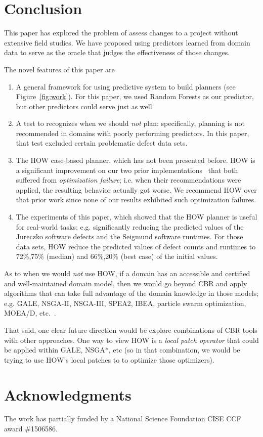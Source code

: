 \documentclass[conference]{IEEEtran}
\newcommand{\be}{\begin{enumerate}}
\newcommand{\ee}{\end{enumerate}}
\newcommand{\fig}[1]{Figure~\ref{fig:#1}}
\begin{document}
%


\section{Conclusion}
 
This paper has explored the problem of assess changes to a project without
extensive field studies. We have proposed using predictors learned from domain data
to serve as the oracle that judges the effectiveness of those changes.

The novel features of this paper are
\be
\item A general framework for using  predictive system to build planners (see \fig{work}).
For this paper, we used Random Forests as our predictor, but other predictors could
serve just as well.
\item A  test to recognizes  when we should {\em not}  plan: specifically,
planning is
not recommended in domains with  poorly performing predictors. In this paper, that
test excluded certain problematic defect data sets.
\item The HOW  case-based planner, which has not been presented before. HOW
is a significant improvement on our two prior implementations~\cite{6600685,me12c} that both
suffered
from {\em optimization failure}; i.e. when their recommendations were applied,
the resulting behavior actually got worse. We recommend HOW over that prior work
since none of our results exhibited such optimization failures.
\item The experiments of this paper, which showed that 
the HOW planner is useful for real-world tasks;
e.g. significantly reducing the
predicted values of the Jureczko software defects and the Seigmund software runtimes.
For those data sets, HOW
reduce
 the predicted values of defect counts and  runtimes to    
 72\%,75\%  (median) and 66\%,20\% (best case) of the initial values.
\ee 
As to when we would {\em not} use HOW, if  a domain has an accessible
and certified and well-maintained
domain model, then we would go beyond CBR and apply algorithms that can take
full advantage of the domain knowledge in those models; e.g. GALE, NSGA-II, NSGA-III, SPEA2, IBEA, particle swarm optimization, MOEA/D, etc.~\cite{krall14,deb00a,zit02,zit04,%
deb14,Cui2005a,zhang07:TEC}. 

That said, one clear future direction would be explore
combinations of CBR tools with other approaches. 
One way to view HOW is a {\em local patch operator} that could be applied within 
GALE, NSGA*, etc (so in that combination, we would be trying to use   HOW's local patches to 
to optimize those optimizers).
 

\section*{Acknowledgments}

The work has partially funded by a National Science Foundation CISE CCF award \#1506586.
 
{}

\balance
\end{document}
